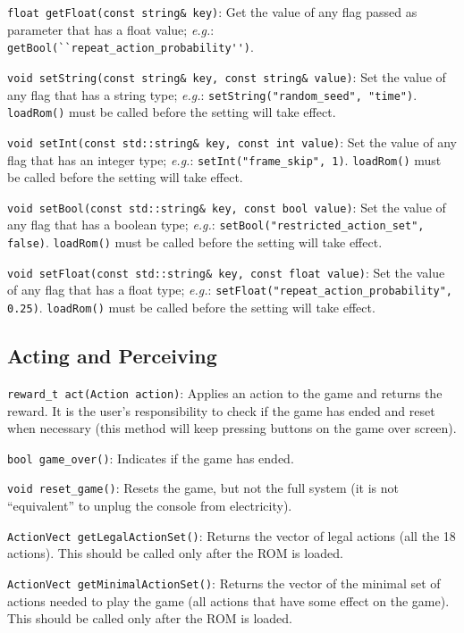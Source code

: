 \documentclass[12pt]{article}
\begin{document}
  \verb+float getFloat(const string& key)+: Get the value of any flag passed as parameter that has 
  a float value; \emph{e.g.}: \verb+getBool(``repeat_action_probability'')+.   
  
  \verb+void setString(const string& key, const string& value)+: Set the value of any flag
  that has a string type; \emph{e.g.}: \verb+setString("random_seed", "time")+.
  \verb+loadRom()+ must be called before the setting will take effect.
  
  \verb+void setInt(const std::string& key, const int value)+: Set the value of any flag
  that has an integer type; \emph{e.g.}: \verb+setInt("frame_skip", 1)+. \verb+loadRom()+
  must be called before the setting will take effect.
  
  \verb+void setBool(const std::string& key, const bool value)+: Set the value of any flag
  that has a boolean type; \emph{e.g.}: \verb+setBool("restricted_action_set", false)+.
  \verb+loadRom()+ must be called before the setting will take effect.
  
  \verb+void setFloat(const std::string& key, const float value)+: Set the value of any flag
  that has a float type; \emph{e.g.}: \verb+setFloat("repeat_action_probability", 0.25)+.
  \verb+loadRom()+ must be called before the setting will take effect.
  
  \subsection{Acting and Perceiving}
  
  \indent \indent \verb+reward_t act(Action action)+: Applies an action to the game and returns the
  reward. It is the user's responsibility to check if the game has ended and reset when necessary
  (this method will keep pressing buttons on the game over screen).
  
  \verb+bool game_over()+: Indicates if the game has ended.
  
  \verb+void reset_game()+: Resets the game, but not the full system (it is not ``equivalent''
  to  unplug the console from electricity).
  
  \verb+ActionVect getLegalActionSet()+: Returns the vector of legal actions (all the 18 actions).
  This should be called only after the ROM is loaded.
  
  \verb+ActionVect getMinimalActionSet()+: Returns the vector of the minimal set of actions
  needed to play the game (all actions that have some effect on the game). This should be
  called only after the ROM is loaded.
  
\end{document}
